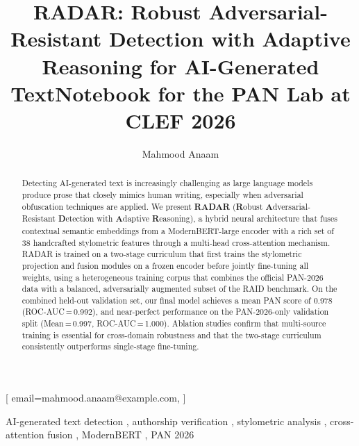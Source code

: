 \documentclass[]{ceurart}
\begin{document}


\title{RADAR: Robust Adversarial-Resistant Detection with Adaptive Reasoning for AI-Generated Text}
\title[mode=sub]{Notebook for the PAN Lab at CLEF 2026}

\author[1]{Mahmood Anaam}[%
  email=mahmood.anaam@example.com,
]

\address[1]{University, Country}


\begin{abstract}
Detecting AI-generated text is increasingly challenging as large language models
produce prose that closely mimics human writing, especially when adversarial obfuscation
techniques are applied. We present \textbf{RADAR} (\textbf{R}obust \textbf{A}dversarial-Resistant
\textbf{D}etection with \textbf{A}daptive \textbf{R}easoning), a hybrid neural architecture
that fuses contextual semantic embeddings from a ModernBERT-large encoder with a rich
set of 38 handcrafted stylometric features through a multi-head cross-attention mechanism.
RADAR is trained on a two-stage curriculum that first trains the stylometric projection
and fusion modules on a frozen encoder before jointly fine-tuning all weights, using a
heterogeneous training corpus that combines the official PAN-2026 data with a balanced,
adversarially augmented subset of the RAID benchmark. On the combined held-out validation
set, our final model achieves a mean PAN score of 0.978 (ROC-AUC\,=\,0.992), and
near-perfect performance on the PAN-2026-only validation split (Mean\,=\,0.997,
ROC-AUC\,=\,1.000). Ablation studies confirm that multi-source training is essential
for cross-domain robustness and that the two-stage curriculum consistently outperforms
single-stage fine-tuning.
\end{abstract}

\begin{keywords}
  AI-generated text detection \sep
  authorship verification \sep
  stylometric analysis \sep
  cross-attention fusion \sep
  ModernBERT \sep
  PAN 2026
\end{keywords}
\end{document}
